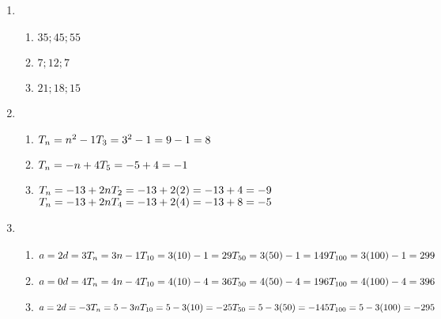  \begin{solutions}{}{
\begin{multicols}{2}
\begin{enumerate}[noitemsep, label=\textbf{\arabic*}. ] 
\item 
  \begin{enumerate} [noitemsep, label=\textbf{(\alph*)} ]
  \item $35;45;55$
  \item $7;12;7$
  \item $21;18;15$
  \end{enumerate}
 \item 
  \begin{enumerate} [noitemsep, label=\textbf{(\alph*)} ]
  \item $T_n = n^{2}-1\\
T_3 = 3^2 - 1\\
= 9 -1\\
= 8$
  \item $T_n = -n + 4\\
T_5 = -5 + 4\\
= -1$
  \item $T_n = -13 + 2n\\
T_2 = -13 + 2(2)\\
= -13 + 4\\
= -9$ \\
$T_n = -13 + 2n\\
T_4 = -13 + 2(4)\\
= -13 + 8\\
= -5$
  \end{enumerate}
\item 
  \begin{enumerate}[noitemsep, label=\textbf{(\alph*)} ]
  \item $a = 2\\
d = 3\\
T_n = 3n - 1\\
T_{10} = 3(10) - 1 = 29\\
T_{50} = 3(50) - 1 = 149\\
T_{100} = 3(100) - 1 = 299$ 
  \item $a = 0\\
d = 4\\
T_n = 4n - 4\\
T_{10} = 4(10) - 4 = 36\\
T_{50} = 4(50) - 4 = 196\\
T_{100} = 4(100) - 4 = 396$ 
  \item $a = 2\\
d = -3\\
T_n = 5 - 3n\\
T_{10} = 5 - 3(10) = -25\\
T_{50} = 5 - 3(50) = -145\\
T_{100} = 5 - 3(100) = -295$ 
  \end{enumerate}
\end{enumerate}
\end{multicols}
}
\end{solutions}


